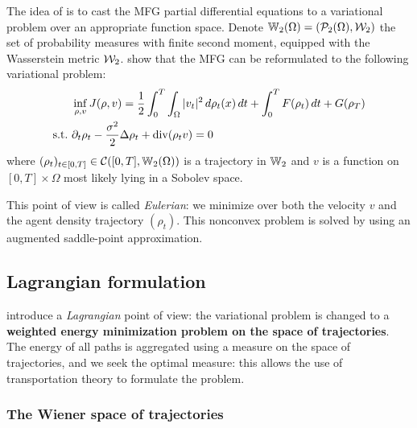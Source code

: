 \documentclass[../report.tex]{subfiles}
\begin{document}
The idea of \cite{benamou:hal-01295299} is to cast the MFG partial differential equations to a variational problem over an appropriate function space. Denote $\mathbb{W}_2(\Omega) = (\mathcal{P}_2(\Omega), \mathcal{W}_2)$ the set of probability measures with finite second moment, equipped with the Wasserstein metric $\mathcal{W}_2$.
\autocite{benamou:hal-01295299} show that the MFG can be reformulated to the following variational problem:
\begin{equation}\label{eq:EulerianProblem}
\begin{aligned}
&\inf_{\rho,v} J(\rho, v) =
\frac{1}{2}\int_0^T\int_\Omega |v_t|^2 \,d\rho_t(x)\,dt + \int_0^T F(\rho_t)\,dt + G(\rho_T)
\\
\mathrm{s.t.}\ &\partial_t \rho_t - \frac{\sigma^2}{2}\Delta \rho_t + \operatorname{div}(\rho_t v) = 0
\end{aligned}
\end{equation}
where $(\rho_t)_{t\in[0,T]}\in \mathcal{C}([0,T], \mathbb{W}_2(\Omega))$ is a trajectory in $\mathbb{W}_2$ and $v$ is a function on $[0,T] \times \Omega$ most likely lying in a Sobolev space.

This point of view is called \textit{Eulerian}: we minimize over both the velocity $v$ and the agent density trajectory $(\rho_t)$. This nonconvex problem is solved by \textcite{benamou:hal-01295299,benamou2015lagrangian} using an augmented saddle-point approximation.


\subsection{Lagrangian formulation}

\textcite{benamou:hal-01295299,benamou2018entropy} introduce a \textit{Lagrangian} point of view: the variational problem is changed to a \textbf{weighted energy minimization problem on the space of trajectories}. The energy of all paths is aggregated using a measure on the space of trajectories, and we seek the optimal measure: this allows the use of transportation theory to formulate the problem.

\subsubsection{The Wiener space of trajectories}
 
\end{document}
